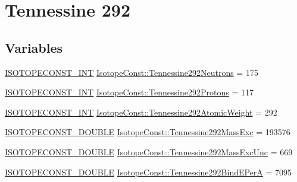 \hypertarget{group___isotope_const-_tennessine-_ts292}{}\section{Tennessine 292}
\label{group___isotope_const-_tennessine-_ts292}
\subsection*{Variables}
\begin{DoxyCompactItemize}
\item 
\mbox{\hyperlink{group___isotope_const-_macros_ga5f18360b3e99483a35c32d789e62621c}{I\+S\+O\+T\+O\+P\+E\+C\+O\+N\+S\+T\+\_\+\+I\+NT}} \mbox{\hyperlink{group___isotope_const-_tennessine-_ts292_gab413b33533e820e718083c01096446ab}{Isotope\+Const\+::\+Tennessine292\+Neutrons}} = 175
\item 
\mbox{\hyperlink{group___isotope_const-_macros_ga5f18360b3e99483a35c32d789e62621c}{I\+S\+O\+T\+O\+P\+E\+C\+O\+N\+S\+T\+\_\+\+I\+NT}} \mbox{\hyperlink{group___isotope_const-_tennessine-_ts292_ga8b01479e389b51ec5d2c2a11e9e1d742}{Isotope\+Const\+::\+Tennessine292\+Protons}} = 117
\item 
\mbox{\hyperlink{group___isotope_const-_macros_ga5f18360b3e99483a35c32d789e62621c}{I\+S\+O\+T\+O\+P\+E\+C\+O\+N\+S\+T\+\_\+\+I\+NT}} \mbox{\hyperlink{group___isotope_const-_tennessine-_ts292_ga2d7ce3385dc30e17dc323f7ff317ba5f}{Isotope\+Const\+::\+Tennessine292\+Atomic\+Weight}} = 292
\item 
\mbox{\hyperlink{group___isotope_const-_macros_ga8f45a7272ce02c0b4c65c44636ed719a}{I\+S\+O\+T\+O\+P\+E\+C\+O\+N\+S\+T\+\_\+\+D\+O\+U\+B\+LE}} \mbox{\hyperlink{group___isotope_const-_tennessine-_ts292_gaf6e1e7d7ec1ad97b852b064c1b9a5702}{Isotope\+Const\+::\+Tennessine292\+Mass\+Exc}} = 193576
\item 
\mbox{\hyperlink{group___isotope_const-_macros_ga8f45a7272ce02c0b4c65c44636ed719a}{I\+S\+O\+T\+O\+P\+E\+C\+O\+N\+S\+T\+\_\+\+D\+O\+U\+B\+LE}} \mbox{\hyperlink{group___isotope_const-_tennessine-_ts292_gabf83ceba5066b0ed7f730de27a8764c8}{Isotope\+Const\+::\+Tennessine292\+Mass\+Exc\+Unc}} = 669
\item 
\mbox{\hyperlink{group___isotope_const-_macros_ga8f45a7272ce02c0b4c65c44636ed719a}{I\+S\+O\+T\+O\+P\+E\+C\+O\+N\+S\+T\+\_\+\+D\+O\+U\+B\+LE}} \mbox{\hyperlink{group___isotope_const-_tennessine-_ts292_ga41df1eae555b803ea130430114b98cd8}{Isotope\+Const\+::\+Tennessine292\+Bind\+E\+PerA}} = 7095
\item 

\end{DoxyCompactItemize}
